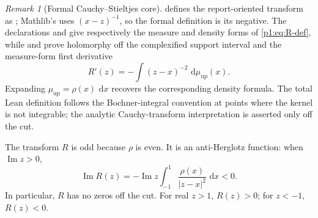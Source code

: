 \documentclass[11pt]{article}
\theoremstyle{definition}
\theoremstyle{remark}
\newtheorem{remark}[theorem]{Remark}
\newcommand{\dd}{\,\mathrm d}
\begin{document}
\begin{remark}[Formal Cauchy--Stieltjes core]
 defines the report-oriented transform as
; Mathlib's  uses
\((x-z)^{-1}\), so the formal definition is its negative.  The declarations
 and
 give respectively the
measure and density forms of \eqref{p1:eq:R-def}, while
 and
 prove holomorphy off the complexified
support interval and the measure-form first derivative
\[
 R'(z)=-\int (z-x)^{-2}\,\dd\mu_{\mathrm{up}}(x).
\]
Expanding \(\mu_{\mathrm{up}}=\rho(x)\,\dd x\) recovers the corresponding density formula.
The total Lean definition follows the Bochner-integral convention at points where the
kernel is not integrable; the analytic Cauchy-transform interpretation is asserted only
off the cut.
\end{remark}

The transform \(R\) is odd because \(\rho\) is even.  It is an anti-Herglotz function:
when \(\operatorname{Im}z>0\),
\begin{equation}
 \operatorname{Im}R(z)
 =-\operatorname{Im}z\int_{-1}^{1}\frac{\rho(x)}{|z-x|^2}\,\dd x<0. \label{p1:eq:R-anti-Herglotz}
\end{equation}
In particular, \(R\) has no zeros off the cut.  For real \(z>1\), \(R(z)>0\); for
\(z<-1\), \(R(z)<0\).
\end{document}
